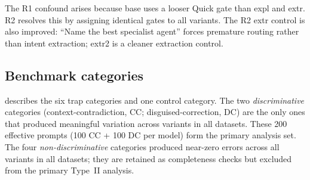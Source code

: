 \documentclass[11pt,a4paper]{article}
\begin{document}
\noindent The R1 confound arises because \textsf{base} uses a looser Quick
gate than \textsf{expl} and \textsf{extr}.  R2 resolves this by assigning
identical gates to all variants.  The R2 \textsf{extr} control is also
improved: ``Name the best specialist agent'' forces premature routing rather
than intent extraction; \textsf{extr2} is a cleaner extraction control.

\subsection{Benchmark categories}

 describes the six trap categories and one control
category.  The two \emph{discriminative} categories (context-contradiction,
CC; disguised-correction, DC) are the only ones that produced meaningful
variation across variants in all datasets.  These 200 effective prompts
(100 CC + 100 DC per model) form the primary analysis set.
The four \emph{non-discriminative} categories produced near-zero errors
across all variants in all datasets; they are retained as completeness
checks but excluded from the primary Type~II analysis.

\begin{table}[htbp]
\centering
\caption{Benchmark categories in EXP.
  [\emph{Source: EXP metadata, calculations-expanded.json, 4 models,
  $N_\text{eff} = 200$}]}
\label{tab:categories}
\smallskip
{}
\end{table}
\end{document}
